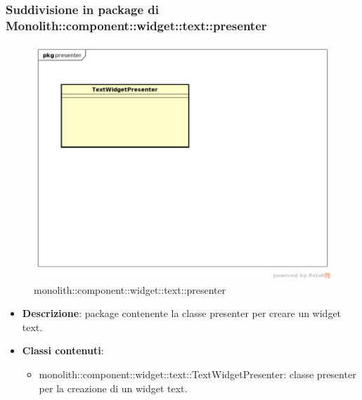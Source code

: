 \subsubsection{Suddivisione in package  di Monolith::component::widget::text::presenter}
\label{monolith::component::widget::text::presenter}
\begin{figure}[H]
	\centering
	\includegraphics[scale=0.5]{Sezioni/imgPackage/component_widget_text_presenter.png}
	\caption{monolith::component::widget::text::presenter}
\end{figure}
\begin{itemize}
	\item{\textbf{Descrizione}}: package contenente la classe presenter per creare un widget text.
	\item{\textbf{Classi contenuti}}:
	\begin{itemize}
	\item{monolith::component::widget::text::TextWidgetPresenter}: classe presenter per la creazione di un widget text.
	\end{itemize}
\end{itemize}



